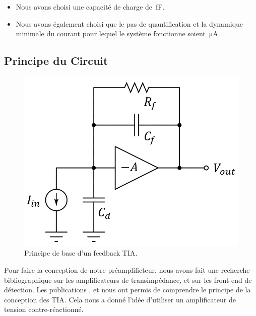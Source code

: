 \documentclass[a4paper,12pt]{article}
\numberwithin{equation}{section}
\newcommand{\?}{\stackrel{?}{=}}
\newcommand{\sis}[2]{\complexnum{#1}\,\si[per-mode=symbol]{#2}}
\begin{document}
\begin{itemize}
    \item Nous avons choisi une capacité de charge de \sis{80}{\femto\farad}.
    
    \item Nous avons également choisi que le pas de quantification et la dynamique minimale du courant pour lequel le système fonctionne soient \sis{1.9}{\micro\ampere}.
\end{itemize}

\subsection{Principe du Circuit}\label{sub:principe_du_circuit}

\begin{figure}
    \centering
    \vspace{-10mm}
    \includegraphics[width=\linewidth]{images/eq_model.png}
    \caption{Principe de base d'un feedback TIA.}
    \label{fig:eq_model}
\end{figure}

Pour faire la conception de notre préamplificteur, nous avons fait une recherche bibliographique sur les amplificateurs de transimpédance, et sur les front-end de détection. Les publications \cite{razavi_2000}, \cite{razavi_2019} et \cite{razavi_2023} nous ont permis de comprendre le principe de la conception des TIA. Cela nous a donné l'idée d'utiliser un amplificateur de tension contre-réactionné.
\end{document}
